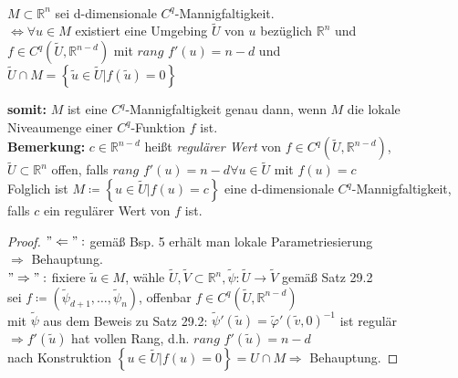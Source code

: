 \begin{satz}
\mbox{} \\
$M \subset \mathbb{R}^n $ sei d-dimensionale $C^q$-Mannigfaltigkeit. \\
$\Longleftrightarrow \forall u \in M $ existiert eine Umgebing $\tilde{U}$ von $u$
bezüglich $\mathbb{R}^n$ und \\
$f \in C^q \left( \tilde{U}, \mathbb{R}^{n-d} \right)$ 
mit $\textit{rang } f' (u) = n-d $ und \\
$\tilde{U} \cap M = \left\lbrace \tilde{u} \in \tilde{U} | f (\tilde{u}) = 0 \right\rbrace $
\end{satz}

\textbf{somit:} $M$ ist eine $C^q$-Mannigfaltigkeit genau dann, 
wenn $M$ die lokale Niveaumenge einer $C^q$-Funktion $f$ ist. \\

\textbf{Bemerkung:} $c \in \mathbb{R}^{n-d} $ heißt \textit{regulärer Wert} von
$f \in C^q \left( \tilde{U}, \mathbb{R}^{n-d} \right) $, \\
$\tilde{U} \subset \mathbb{R}^n $
offen, falls $\textit{rang } f' (u) = n-d \forall u \in \tilde{U} $ mit $f(u) = c $ \\
Folglich ist $M \coloneqq \left\lbrace u \in \tilde{U} | f(u) = c \right\rbrace $ 
eine d-dimensionale $C^q$-Mannigfaltigkeit, falls $c$ ein regulärer Wert von $f$ ist.

\begin{proof}
$"\Leftarrow":$ gemäß Bsp. 5 erhält man lokale Parametriesierung \\
$\Rightarrow$ Behauptung. \\
$"\Rightarrow":$ fixiere $\tilde{u} \in M$, 
wähle $\tilde{U}, \tilde{V} \subset \mathbb{R}^n, 
\tilde{\psi}: \tilde{U} \rightarrow \tilde{V} $ gemäß Satz 29.2 \\
sei $f \coloneqq \left( \tilde{\psi}_{d+1}, \ldots , \tilde{\psi}_n \right)$,
offenbar $f \in C^q \left(  \tilde{U}, \mathbb{R}^{n-d} \right) $ \\
mit $\tilde{\psi}$ aus dem Beweis zu Satz 29.2:
$\tilde{\psi}' (\tilde{u}) = \tilde{\varphi}' (\tilde{v}, 0)^{-1} $ ist regulär \\
$\Rightarrow f'(\tilde{u}) $ hat vollen Rang, d.h. $\textit{rang } f'(\tilde{u}) = n-d $ \\
nach Konstruktion $ \left\lbrace u \in \tilde{U} | f(u) = 0 \right\rbrace = U \cap M
\Rightarrow $ Behauptung.
\end{proof}

